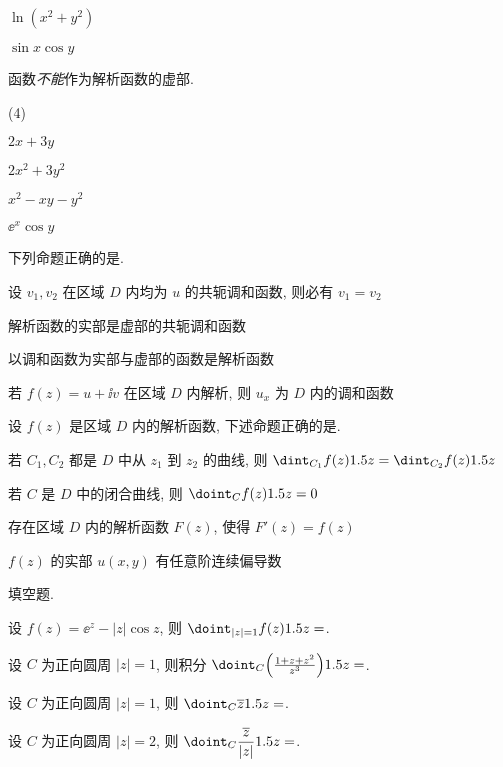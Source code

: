 \begin{homework}
\begin{homework}
\begin{exchoice}
        \item $\ln(x^2+y^2)$
        \item $\sin x\cos y$
      \end{exchoice}
    \item 函数\fillbrace{}\emph{不能}作为解析函数的虚部.
      \begin{exchoice}(4)
        \item $2x+3y$
        \item $2x^2+3y^2$
        \item $x^2-xy-y^2$
        \item $\ee^x\cos y$
      \end{exchoice}
    \item 下列命题正确的是\fillbrace{}.
      \begin{exchoice}
        \item 设 $v_1,v_2$ 在区域 $D$ 内均为 $u$ 的共轭调和函数, 则必有 $v_1=v_2$
        \item 解析函数的实部是虚部的共轭调和函数
        \item 以调和函数为实部与虚部的函数是解析函数
        \item 若 $f(z)=u+\ii v$ 在区域 $D$ 内解析, 则 $u_x$ 为 $D$ 内的调和函数
      \end{exchoice}
    \item 设 $f(z)$ 是区域 $D$ 内的解析函数, 下述命题正确的是\fillbrace{}.
      \begin{exchoice}
        \item 若 $C_1,C_2$ 都是 $D$ 中从 $z_1$ 到 $z_2$ 的曲线, 则 $\dint_{C_1}f(z)\d z=\dint_{C_2}f(z)\d z$
        \item 若 $C$ 是 $D$ 中的闭合曲线, 则 $\doint_Cf(z)\d z=0$
        \item 存在区域 $D$ 内的解析函数 $F(z)$, 使得 $F'(z)=f(z)$
        \item $f(z)$ 的实部 $u(x,y)$ 有任意阶连续偏导数
      \end{exchoice}
  \end{homework}
  \item 填空题.
  \begin{homework}
    \item 设 $f(z)=\ee^z-|z|\cos z$, 则 $\doint_{|z|=1}f(z)\d z=$\fillblank{}.
    \item 设 $C$ 为正向圆周 $|z|=1$, 则积分 $\doint_C\Bigl(\frac{1+z+z^2}{z^3}\Bigr)\d z=$\fillblank{}.
    \item 设 $C$ 为正向圆周 $|z|=1$, 则 $\doint_C\ov z\d z=$\fillblank{}.
    \item 设 $C$ 为正向圆周 $|z|=2$, 则 $\doint_C\dfrac{\ov z}{|z|}\d z=$\fillblank{}.

\end{homework}
\end{homework}
